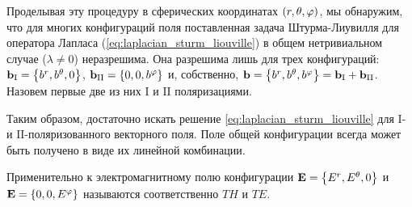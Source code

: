 \documentclass[12pt,a4paper]{article}
\begin{document}
        Проделывая эту процедуру в сферических координатах $\qty(r, \theta, \varphi)$, мы обнаружим, что для многих конфигураций поля поставленная задача Штурма-Лиувилля для оператора Лапласа (\autoref{eq:laplacian_sturm_liouville}) в общем нетривиальном случае ($\lambda \neq 0$) неразрешима. Она разрешима лишь для трех конфигураций: $\vb{b}_{\mathrm{I}} = \qty{ b^r, b^\theta, 0 }$, $\vb{b}_{\mathrm{II}} = \qty{ 0, 0, b^\varphi }$ и, собственно, $\vb{b} = \qty{ b^r, b^\theta, b^\varphi } = \vb{b}_{\mathrm{I}} + \vb{b}_{\mathrm{II}}$. Назовем первые две из них $\mathrm{I}$ и $\mathrm{II}$ поляризациями.

        Таким образом, достаточно искать решение \autoref{eq:laplacian_sturm_liouville} для $\mathrm{I}$- и $\mathrm{II}$-поляризованного векторного поля. Поле общей конфигурации всегда может быть получено в виде их линейной комбинации.

        Применительно к электромагнитному полю конфигурации $\vb{E} = \qty{ E^r, E^\theta, 0 }$ и $\vb{E} = \qty{ 0, 0, E^\varphi }$ называются соответственно\footnotemark{} $TH$ и $TE$.



    \nocite{*}
    
    
\end{document}
